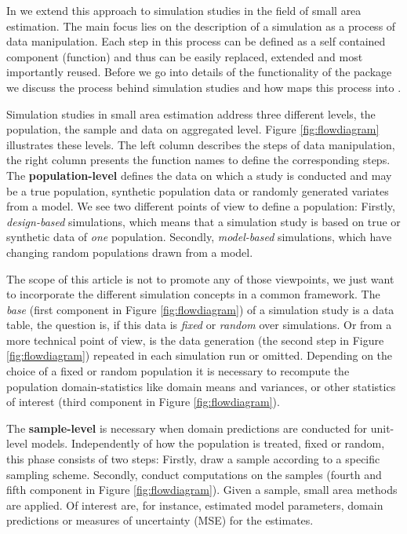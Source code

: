 \documentclass[article]{ajs}
\begin{document}
In  we extend this approach to simulation studies in the field of small area estimation. The main focus lies on the description of a simulation as a process of data manipulation. Each step in this process can be defined as a self contained component (function) and thus can be easily replaced, extended and most importantly reused. Before we go into details of the functionality of the package we discuss the process behind simulation studies and how  maps this process into .

Simulation studies in small area estimation address three different levels, the population, the sample and data on aggregated level. Figure \ref{fig:flowdiagram} illustrates these levels. The left column describes the steps of data manipulation, the right column presents the function names to define the corresponding steps. The \textbf{population-level} defines the data on which a study is conducted and may be a true population, synthetic population data or randomly generated variates from a model. We see two different points of view to define a population: Firstly, \textit{design-based} simulations, which means that a simulation study is based on true or synthetic data of \textit{one} population. Secondly, \textit{model-based} simulations, which have changing random populations drawn from a model.

The scope of this article is not to promote any of those viewpoints, we just want to incorporate the different simulation concepts in a common framework. The \textit{base} (first component in Figure \ref{fig:flowdiagram}) of a simulation study is a data table, the question is, if this data is \textit{fixed} or \textit{random} over simulations. Or from a more technical point of view, is the data generation (the second step in Figure \ref{fig:flowdiagram}) repeated in each simulation run or omitted. Depending on the choice of a fixed or random population it is necessary to recompute the population domain-statistics like domain means and variances, or other statistics of interest (third component in Figure \ref{fig:flowdiagram}).

The \textbf{sample-level} is necessary when domain predictions are conducted for unit-level models. Independently of how the population is treated, fixed or random, this phase consists of two steps: Firstly, draw a sample according to a specific sampling scheme. Secondly, conduct computations on the samples (fourth and fifth component in Figure \ref{fig:flowdiagram}). Given a sample, small area methods are applied. Of interest are, for instance, estimated model parameters, domain predictions or measures of uncertainty (MSE) for the estimates.
\end{document}
